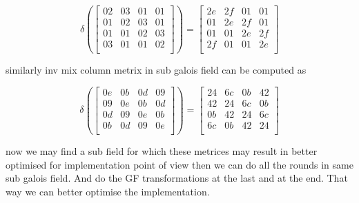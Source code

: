 \documentclass[10pt, conference, compsocconf]{IEEEtran}
\begin{document}
\begin{equation}
\delta \left(\left[ \begin{array}{cccccccc}
02 & 03 & 01 & 01\\
01 & 02 & 03 & 01\\
01 & 01 & 02 & 03\\
03 & 01 & 01 & 02\\
 \end{array} \right]\right) = \left[ \begin{array}{cccccccc}
2e & 2f & 01 & 01\\
01 & 2e & 2f & 01\\
01 & 01 & 2e & 2f\\
2f & 01 & 01 & 2e\\
 \end{array} \right]
\end{equation}


similarly inv mix column metrix in sub galois field can be computed as


\begin{equation}
\delta \left(\left[ \begin{array}{cccccccc}
0e & 0b & 0d & 09\\
09 & 0e & 0b & 0d\\
0d & 09 & 0e & 0b\\
0b & 0d & 09 & 0e\\
 \end{array} \right]\right) = \left[ \begin{array}{cccccccc}
24 & 6c & 0b & 42\\
42 & 24 & 6c & 0b\\
0b & 42 & 24 & 6c\\
6c & 0b & 42 & 24\\
 \end{array} \right]
\end{equation}

now we may find a sub field for which these metrices may result in better optimised for implementation point of view then we can do all the rounds in same sub galois field. And do the GF transformations at the last and at the end. That way we can better optimise the implementation.




\end{document}
